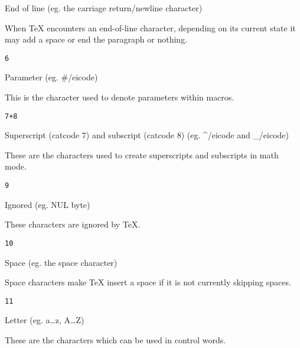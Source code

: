 {{    \textbox\empty{3cm}{\lastoy}{\hsize-4cm}{}
        End of line (eg. the carriage return/newline character)

        When \TeX{} encounters an end-of-line character, depending on its current state it may add a space or end the paragraph or nothing.
    \endtextbox

\endslide

\beginslide
    \oheadline

    \textbox{}
        \centerline{\color{white}\tt6}
    \endtextbox

    \textbox\empty{3cm}{\lastoy}{\hsize-4cm}{}
        Parameter (eg. \icode #/eicode)

        This is the character used to denote parameters within macros.
    \endtextbox

    \textbox{}
        \centerline{\color{white}\tt7+8}
    \endtextbox

    \textbox\empty{3cm}{\lastoy}{\hsize-4cm}{}
        Superscript (catcode $7$) and subscript (catcode $8$) (eg. \icode ^/eicode{} and \icode _/eicode)

        These are the characters used to create superscripts and subscripts in math mode.
    \endtextbox

    \textbox{}
        \centerline{\color{white}\tt9}
    \endtextbox

    \textbox\empty{3cm}{\lastoy}{\hsize-4cm}{}
        Ignored (eg. NUL byte)

        These characters are ignored by \TeX.
    \endtextbox

    \textbox{}
        \centerline{\color{white}\tt10}
    \endtextbox

    \textbox\empty{3cm}{\lastoy}{\hsize-4cm}{}
        Space (eg. the space character)

        Space characters make \TeX{} insert a space if it is not currently skipping spaces.
    \endtextbox

    \textbox{}
        \centerline{\color{white}\tt11}
    \endtextbox

    \textbox\empty{3cm}{\lastoy}{\hsize-4cm}{}
        Letter (eg. a\dots z, A\dots Z)

        These are the characters which can be used in control words.
    \endtextbox

}}
